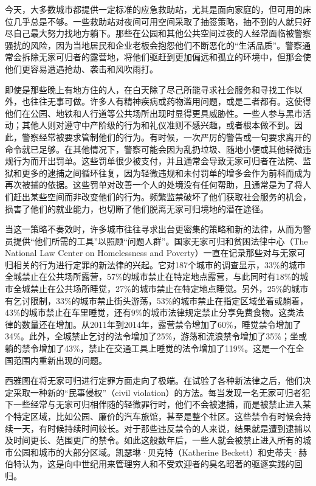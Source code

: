 \documentclass[fontset=fandol, a4paper, 12pt, openright]{ctexbook}
\begin{document}
今天，大多数城市都提供一定标准的应急救助站，尤其是面向家庭的，但可用的床位几乎总是不够。一些救助站对夜间可用空间采取了抽签策略，抽不到的人就只好尽自己最大努力找地方躺下。那些在公园和其他公共空间过夜的人经常面临被警察骚扰的风险，因为当地居民和企业老板会抱怨他们不断恶化的“生活品质”。警察通常会拆除无家可归者的露营地，将他们驱赶到更加偏远和孤立的环境中，但那会使他们更容易遭遇抢劫、袭击和风吹雨打。

即使是那些晚上有地方住的人，在白天除了尽己所能寻求社会服务和寻找工作以外，也往往无事可做。许多人有精神疾病或药物滥用问题，或是二者都有。这使得他们在公园、地铁和人行道等公共场所出现时显得更具威胁性。一些人参与黑市活动；其他人则对遵守中产阶级的行为和礼仪准则不感兴趣，或者根本做不到。因此，警察经常被要求管制他们的行为。有时候，一次严厉的警告或一句要求离开的命令就已足够。在其他情况下，警察可能会因为乱扔垃圾、随地小便或其他轻微违规行为而开出罚单。这些罚单很少被支付，并且通常会导致无家可归者在法院、监狱和更多的逮捕之间循环往复，因为轻微违规和未付罚单的增多会作为前科而成为再次被捕的依据。这些罚单对改善一个人的处境没有任何帮助，且通常是为了将人们赶出某些空间而非改变他们的行为。频繁监禁破坏了他们获取社会服务的机会，损害了他们的就业能力，也切断了他们脱离无家可归境地的潜在途径。

当这一策略不奏效时，许多城市往往寻求出台更密集的策略和新的法律，从而为警员提供“他们所需的工具”以照顾“问题人群”。国家无家可归和贫困法律中心（The National Law Center on Homelessness and Poverty）一直在记录那些对与无家可归相关的行为进行定罪的新法律的兴起。它对187个城市的调查显示，33\%的城市全城禁止在公共场所露营，57\%的城市禁止在特定地点露营，与此同时有18\%的城市全城禁止在公共场所睡觉，27\%的城市禁止在特定地点睡觉。另外，25\%的城市有乞讨限制，33\%的城市禁止街头游荡，53\%的城市禁止在指定区域坐着或躺着，43\%的城市禁止在车里睡觉，还有9\%的城市法律规定禁止分享免费食物。这类法律的数量还在增加。从2011年到2014年，露营禁令增加了60\%，睡觉禁令增加了34\%。此外，全城禁止乞讨的法令增加了25\%，游荡和流浪禁令增加了35\%；坐或躺的禁令增加了43\%，禁止在交通工具上睡觉的法令增加了119\%。这是一个在全国范围内重新出现的问题。

西雅图在将无家可归进行定罪方面走向了极端。在试验了各种新法律之后，他们决定采取一种新的“民事侵权”（civil violation）的方法。每当发现一名无家可归者犯下一些经常与无家可归相伴随的轻微罪行时，他们不会被逮捕，而是被禁止进入某个特定区域，比如公园、廉价的汽车旅馆，甚至是整个社区。这些禁令有时候会持续一天，有时候持续时间较长。对于那些违反禁令的人来说，结果就是遭到逮捕以及时间更长、范围更广的禁令。如此这般数年后，一些人就会被禁止进入所有的城市公园和城市的大部分区域。凯瑟琳·贝克特（Katherine Beckett）和史蒂夫·赫伯特认为，这是向中世纪用来管理穷人和不受欢迎者的臭名昭著的驱逐实践的回归。
\end{document}
